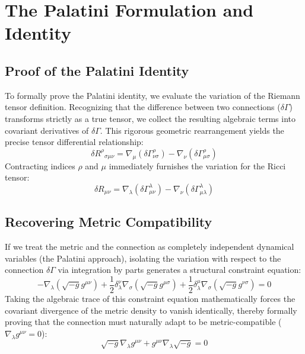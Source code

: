 \documentclass[11pt, a4paper]{report}
\begin{document}
\section{The Palatini Formulation and Identity}
\subsection{Proof of the Palatini Identity}
To formally prove the Palatini identity, we evaluate the variation of the Riemann tensor definition. Recognizing that the difference between two connections ($\delta\Gamma$) transforms strictly as a true tensor, we collect the resulting algebraic terms into covariant derivatives of $\delta\Gamma$. This rigorous geometric rearrangement yields the precise tensor differential relationship:
\begin{equation}
\label{eq:palatini_riemann}
\delta{R^{\rho}}_{\sigma\mu\nu} = \nabla_{\mu}(\delta\Gamma^{\rho}_{\nu\sigma}) - \nabla_{\nu}(\delta\Gamma^{\rho}_{\mu\sigma})
\end{equation}
Contracting indices $\rho$ and $\mu$ immediately furnishes the variation for the Ricci tensor:
\begin{equation}
\label{eq:palatini_ricci}
\delta R_{\mu\nu} = \nabla_{\lambda}(\delta\Gamma^{\lambda}_{\mu\nu}) - \nabla_{\nu}(\delta\Gamma^{\lambda}_{\mu\lambda})
\end{equation}

\subsection{Recovering Metric Compatibility}
If we treat the metric and the connection as completely independent dynamical variables (the Palatini approach), isolating the variation with respect to the connection $\delta\Gamma$ via integration by parts generates a structural constraint equation:
\begin{equation}
\label{eq:palatini_constraint}
-\nabla_{\lambda}(\sqrt{-g}g^{\mu\nu}) + \frac{1}{2}\delta^{\nu}_{\lambda} \nabla_{\sigma}(\sqrt{-g}g^{\mu\sigma}) + \frac{1}{2}\delta^{\mu}_{\lambda} \nabla_{\sigma}(\sqrt{-g}g^{\nu\sigma}) = 0
\end{equation}
Taking the algebraic trace of this constraint equation mathematically forces the covariant divergence of the metric density to vanish identically, thereby formally proving that the connection must naturally adapt to be metric-compatible ($\nabla_{\lambda}g^{\mu\nu} = 0$):
\begin{equation}
\label{eq:density_product_rule}
\sqrt{-g}\nabla_{\lambda}g^{\mu\nu} + g^{\mu\nu}\nabla_{\lambda}\sqrt{-g} = 0
\end{equation}
\end{document}
